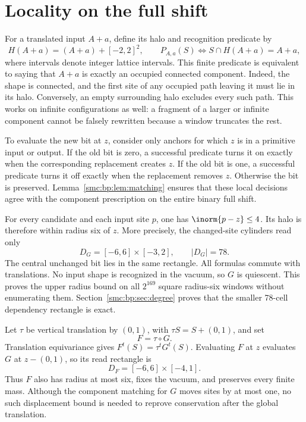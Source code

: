 \documentclass[11pt,letterpaper]{article}
\numberwithin{equation}{section}
\theoremstyle{definition}
\theoremstyle{remark}
\begin{document}
\section{Locality on the full shift}\label{smc:bp:sec:locality}
For a translated input $A+a$, define its halo and recognition predicate by
\[
H(A+a)=(A+a)+[-2,2]^2,\qquad
P_{A,a}(S)\Longleftrightarrow S\cap H(A+a)=A+a,
\]
where intervals denote integer lattice intervals. This finite predicate is equivalent to saying that $A+a$ is exactly an occupied connected component. Indeed, the shape is connected, and the first site of any occupied path leaving it must lie in its halo. Conversely, an empty surrounding halo excludes every such path. This works on infinite configurations as well: a fragment of a larger or infinite component cannot be falsely rewritten because a window truncates the rest.

To evaluate the new bit at $z$, consider only anchors for which $z$ is in a primitive input or output. If the old bit is zero, a successful predicate turns it on exactly when the corresponding replacement creates $z$. If the old bit is one, a successful predicate turns it off exactly when the replacement removes $z$. Otherwise the bit is preserved. Lemma~\ref{smc:bp:lem:matching} ensures that these local decisions agree with the component prescription on the entire binary full shift.

For every candidate and each input site $p$, one has $\inorm{p-z}\le4$. Its halo is therefore within radius six of $z$. More precisely, the changed-site cylinders read only
\begin{equation}\label{smc:bp:eq:rectG}
D_G=[-6,6]\times[-3,2],\qquad |D_G|=78.
\end{equation}
The central unchanged bit lies in the same rectangle. All formulas commute with translations. No input shape is recognized in the vacuum, so $G$ is quiescent. This proves the upper radius bound on all $2^{169}$ square radius-six windows without enumerating them. Section~\ref{smc:bp:sec:degree} proves that the smaller 78-cell dependency rectangle is exact.

Let $\tau$ be vertical translation by $(0,1)$, with $\tau S=S+(0,1)$, and set
\begin{equation}\label{smc:bp:eq:F}
F=\tau\circ G.
\end{equation}
Translation equivariance gives $F^t(S)=\tau^tG^t(S)$. Evaluating $F$ at $z$ evaluates $G$ at $z-(0,1)$, so its read rectangle is
\begin{equation}\label{smc:bp:eq:rectF}
D_F=[-6,6]\times[-4,1].
\end{equation}
Thus $F$ also has radius at most six, fixes the vacuum, and preserves every finite mass. Although the component matching for $G$ moves sites by at most one, no such displacement bound is needed to reprove conservation after the global translation.
\end{document}
